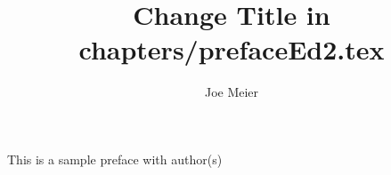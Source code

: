 \documentclass[output=paper]{langsci/langscibook}
\title{Change Title in chapters/prefaceEd2.tex}
\author{%
 Joe Meier  \affiliation{University of Eden}  
}
\begin{document}
\noindent This is a sample preface with author(s)

{\sloppy
\printbibliography[heading=subbibliography,notkeyword=this]
}
\end{document}
